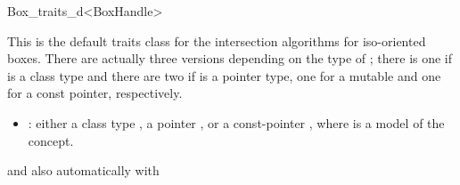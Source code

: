 
\begin{ccRefClass}{Box_traits_d<BoxHandle>}

\ccDefinition

This is the default traits class for the intersection algorithms for
iso-oriented boxes. There are actually three versions depending on the
type of ; there is one if  is a class type and there are
two if  is a pointer type, one for a mutable and one for a const
pointer, respectively.

\begin{itemize}
  \item
    : either a class type , a pointer , or a
    const-pointer , where  is a model of the
     concept.
\end{itemize}

and also automatically with\\

\ccIsModel


\ccCreation
{}


\ccSeeAlso

\\
\\

\\

\end{ccRefClass}
